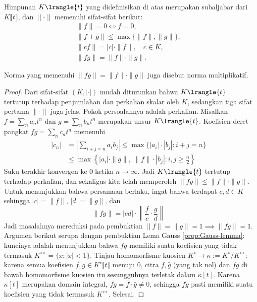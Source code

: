 \begin{lemma}\label{prop:strictly-convergent-series-1}
	Himpunan $K\lrangle{t}$ yang didefinisikan di atas merupakan subaljabar dari $K\llbracket t\rrbracket$, dan $\|\cdot\|$ memenuhi sifat-sifat berikut:
	\begin{gather*}
		\|f\| = 0 \iff f=0, \\
		\|f+g\| \leq \max\{\|f\|, \|g\| \}, \\
		\|cf\| = |c| \cdot \|f\|, \quad c \in K, \\
		\|fg\| = \|f\| \cdot \|g\|.
	\end{gather*}
\end{lemma}
Norma yang memenuhi $\|fg\| = \|f\| \cdot \|g\|$ juga disebut norma multiplikatif.
\begin{proof}
	Dari sifat-sifat $(K, |\cdot|)$ mudah diturunkan bahwa $K\lrangle{t}$ tertutup terhadap penjumlahan dan perkalian skalar oleh $K$, sedangkan tiga sifat pertama $\|\cdot\|$ juga jelas. Pokok persoalannya adalah perkalian. Misalkan $f = \sum_n a_n t^n$ dan $g = \sum_n b_n t^n$ merupakan unsur $K\lrangle{t}$. Koefisien deret pangkat $fg = \sum_n c_n t^n$ memenuhi
	\begin{align*}
		|c_n| & = \left| \sum_{i+j=n} a_i b_j \right| \leq \max\{ |a_i| \cdot |b_j| : i+j=n \} \\
		& \leq \max\left\{ |a_i| \cdot \|g\|, \; \|f\| \cdot |b_j| : i,j \geq \frac{n}{2} \right\}
	\end{align*}
	Suku terakhir konvergen ke $0$ ketika $n \to \infty$. Jadi $K\lrangle{t}$ tertutup terhadap perkalian, dan sekaligus kita telah memperoleh $\|fg\| \leq \|f\| \cdot \|g\|$. Untuk menunjukkan bahwa persamaan berlaku, ingat bahwa terdapat $c,d \in K$ sehingga $|c|=\|f\|$, $|d|=\|g\|$, dan
	\[ \|fg\| = |cd| \cdot \left\| \frac{f}{c} \cdot \frac{g}{d} \right\| \]
	Jadi masalahnya mereduksi pada pembuktian $\|f\|=\|g\|=1 \implies \|fg\|=1$. Argumen berikut serupa dengan pembuktian Lema Gauss \ref{prop:Gauss-lemma}: kuncinya adalah menunjukkan bahwa $fg$ memiliki suatu koefisien yang tidak termasuk $K^{\circ\circ} = \{x: |x| < 1 \}$. Tinjau homomorfisme kuosien $K^\circ \to \kappa := K^\circ/K^{\circ\circ}$: karena semua koefisien $f,g \in K^\circ\llbracket t\rrbracket$ menuju $0$, citra $\bar{f}, \bar{g}$ (yang tak nol) dan $\overline{fg}$ di bawah homomorfisme kuosien itu sesungguhnya terletak dalam $\kappa[t]$. Karena $\kappa[t]$ merupakan domain integral, $\overline{fg} = \bar{f} \cdot \bar{g} \neq 0$, sehingga $fg$ pasti memiliki suatu koefisien yang tidak termasuk $K^{\circ\circ}$. Selesai.
\end{proof}

